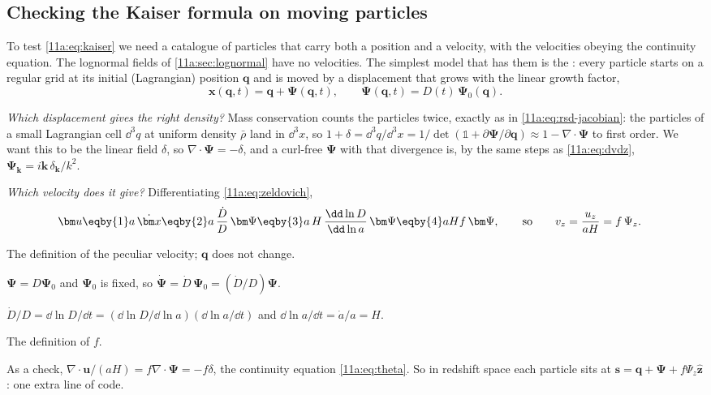 \subsection{Checking the Kaiser formula on moving particles}
\label{11a:sec:rsd-python}

To test \eqref{11a:eq:kaiser} we need a catalogue of particles that carry both a
position and a velocity, with the velocities obeying the continuity equation.
The lognormal fields of \cref{11a:sec:lognormal} have no velocities. The
simplest model that has them is the : every
particle starts on a regular grid at its initial (Lagrangian) position $\bm q$
and is moved by a displacement that grows with the linear growth factor,
\begin{equation}
  \bm x(\bm q,t)=\bm q+\bm\Psi(\bm q,t),\qquad\bm\Psi(\bm q,t)=D(t)\,\bm\Psi_0(\bm q).
  \label{11a:eq:zeldovich}
\end{equation}

\emph{Which displacement gives the right density?} Mass conservation counts the
particles twice, exactly as in \eqref{11a:eq:rsd-jacobian}: the particles of a
small Lagrangian cell $\dd^3q$ at uniform density $\bar\rho$ land in
$\dd^3x$, so $1+\delta=\dd^3q/\dd^3x=1/\det(\mathbb 1+\partial\bm\Psi/\partial\bm q)
\approx1-\nabla\cdot\bm\Psi$ to first order. We want this to be the linear field
$\delta$, so $\nabla\cdot\bm\Psi=-\delta$, and a curl-free $\bm\Psi$ with that
divergence is, by the same steps as \eqref{11a:eq:dvdz},
$\bm\Psi_{\bm k}=i\bm k\,\delta_{\bm k}/k^2$.

\emph{Which velocity does it give?} Differentiating \eqref{11a:eq:zeldovich},
\begin{align*}
  \bm u
  &\eqby{1}a\,\dot{\bm x}
   \eqby{2}a\,\frac{\dot D}{D}\,\bm\Psi
   \eqby{3}a\,H\,\frac{\dd\ln D}{\dd\ln a}\,\bm\Psi
   \eqby{4}aHf\,\bm\Psi,
  \qquad\text{so}\qquad
  v_z=\frac{u_z}{aH}=f\,\Psi_z .
\end{align*}
\begin{explain}
  \item The definition of the peculiar velocity; $\bm q$ does not change.
  \item $\bm\Psi=D\bm\Psi_0$ and $\bm\Psi_0$ is fixed, so $\dot{\bm\Psi}=\dot D\,\bm\Psi_0
        =(\dot D/D)\bm\Psi$.
  \item $\dot D/D=\dd\ln D/\dd t=(\dd\ln D/\dd\ln a)(\dd\ln a/\dd t)$ and
        $\dd\ln a/\dd t=\dot a/a=H$.
  \item The definition of $f$.
\end{explain}
As a check, $\nabla\cdot\bm u/(aH)=f\nabla\cdot\bm\Psi=-f\delta$, the continuity
equation \eqref{11a:eq:theta}. So in redshift space each particle sits at
$\bm s=\bm q+\bm\Psi+f\Psi_z\hat{\bm z}$: one extra line of code.

